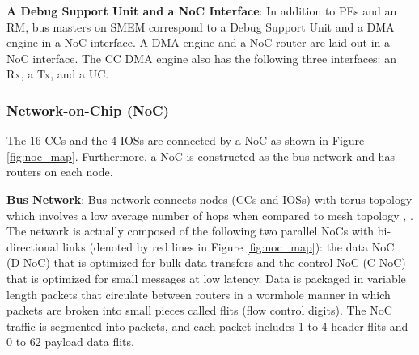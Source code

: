 \documentclass[conference,compsoc]{IEEEtran}
\newcommand{\comment}[1]{}
\begin{document}
\textbf{A Debug Support Unit and a NoC Interface}:
In addition to PEs and an RM, bus masters on SMEM correspond to a Debug Support Unit and a DMA engine in a NoC interface.
A DMA engine and a NoC router are laid out in a NoC interface.
The CC DMA engine also has the following three interfaces: an Rx, a Tx, and a UC. 


\vspace{-3mm}
\subsubsection{Network-on-Chip (NoC)}
\label{sec:noc}
The 16 CCs and the 4 IOSs are connected by a NoC as shown in Figure \ref{fig:noc_map}.
Furthermore, a NoC is constructed \comment{1-12} as the bus network and has routers on each node.

\textbf{Bus Network}:
Bus network connects nodes (CCs and IOSs) with torus topology \cite{dally2001route}
which \comment{1-13} involves a low average number of hops when compared to mesh topology \cite{vangal200780}, \cite{taylor2002raw}.
The network is actually composed of the following two parallel NoCs with bi-directional links (denoted by red lines in Figure \ref{fig:noc_map}):
the data NoC (D-NoC) that is optimized for bulk data transfers and the control NoC (C-NoC) that is optimized for small messages at low latency.
Data is packaged in variable length packets that circulate between routers in a wormhole manner in which packets are broken into small pieces called flits (flow control digits).
The NoC traffic is segmented into packets, and each packet includes 1 to 4 header flits and 0 to 62 payload data flits.
\end{document}
